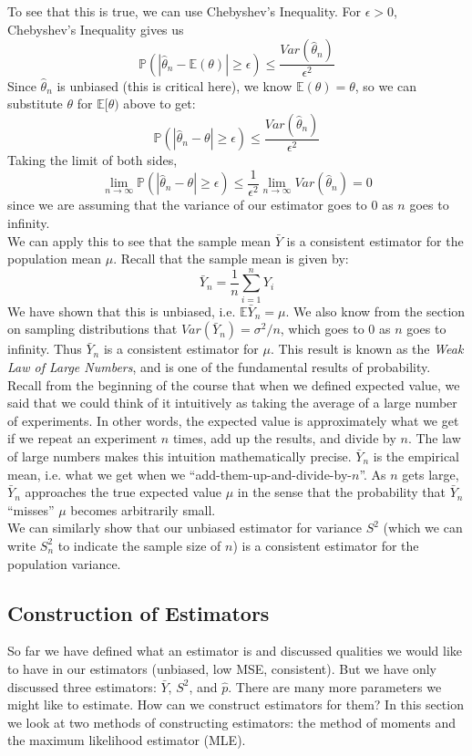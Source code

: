 \documentclass[12pt]{article}
\theoremstyle{definition}
\theoremstyle{remark}
\def\P{{\mathbb P}}
\def\E{{\mathbb E}}
\begin{document}
To see that this is true, we can use Chebyshev's Inequality. For $\epsilon > 0$, Chebyshev's Inequality gives us
\[
\P(|\hat{\theta}_n - \E(\theta)| \geq \epsilon) \leq \frac{Var(\hat{\theta}_n)}{\epsilon^2}
\]
Since $\hat{\theta}_n$ is unbiased (this is critical here), we know $\E(\theta) = \theta$, so we can substitute $\theta$ for $\E[\theta)$ above to get:
\[
\P(|\hat{\theta}_n - \theta| \geq \epsilon) \leq \frac{Var(\hat{\theta}_n)}{\epsilon^2}
\]
Taking the limit of both sides,
\[
\lim_{n\rightarrow\infty} \P(|\hat{\theta}_n - \theta| \geq \epsilon) \leq  \frac{1}{\epsilon^2} \lim_{n\rightarrow\infty} Var(\hat{\theta}_n) = 0
\]
since we are assuming that the variance of our estimator goes to 0 as $n$ goes to infinity.\\

We can apply this to see that the sample mean $\bar{Y}$ is a consistent estimator for the population mean $\mu$. Recall that the sample mean is given by:
\[
\bar{Y}_n = \frac{1}{n} \sum_{i=1}^n Y_i
\]
We have shown that this is unbiased, i.e. $\E{\bar{Y}_n} = \mu$. We also know from the section on sampling distributions that $Var(\bar{Y}_n) = \sigma^2 / n$, which goes to 0 as $n$ goes to infinity. Thus $\bar{Y}_n$ is a consistent estimator for $
\mu$. This result is known as the \emph{Weak Law of Large Numbers}, and is one of the fundamental results of probability. Recall from the beginning of the course that when we defined expected value, we said that we could think of it intuitively as taking the average of a large number of experiments. In other words, the expected value is approximately what we get if we repeat an experiment $n$ times, add up the results, and divide by $n$. The law of large numbers makes this intuition mathematically precise. $\bar{Y}_n$ is the empirical mean, i.e. what we get when we ``add-them-up-and-divide-by-$n$''. As $n$ gets large, $\bar{Y}_n$ approaches the true expected value $\mu$ in the sense that the probability that $\bar{Y}_n$ ``misses'' $\mu$ becomes arbitrarily small.\\

We can similarly show that our unbiased estimator for variance $S^2$ (which we can write $S^2_n$ to indicate the sample size of $n$) is a consistent estimator for the population variance.


\subsection{Construction of Estimators}
So far we have defined what an estimator is and discussed qualities we would like to have in our estimators (unbiased, low MSE, consistent). But we have only discussed three estimators: $\bar{Y}$, $S^2$, and $\hat{p}$. There are many more parameters we might like to estimate. How can we construct estimators for them? In this section we look at two methods of constructing estimators: the method of moments and the maximum likelihood estimator (MLE).
\end{document}
